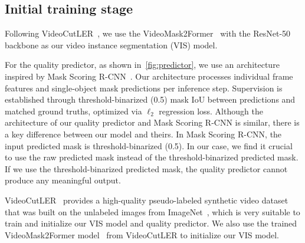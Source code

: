 \subsection{Initial training stage}
\label{sec:initial_model}

Following VideoCutLER~\cite{videocutler}, we use the VideoMask2Former~\cite{mask2former, videomask2former} with the ResNet-50~\cite{resnet} backbone as our video instance segmentation (VIS) model.

For the quality predictor, as shown in~\cref{fig:predictor}, we use an architecture
inspired by Mask Scoring R-CNN~\cite{maskscore}. Our architecture processes individual frame features and single-object mask predictions per inference step. Supervision is established through threshold-binarized (0.5) mask IoU between predictions and matched ground truths, optimized via $\ell_2$ regression loss.
Although the architecture of our quality predictor and Mask Scoring R-CNN is similar, there is a key difference between our model and theirs. In Mask Scoring R-CNN, the input predicted mask is threshold-binarized (0.5). In our case, we find it crucial to use the raw predicted mask instead of the threshold-binarized predicted mask. If we use the threshold-binarized predicted mask, the quality predictor cannot produce any meaningful output. 

VideoCutLER~\cite{videocutler} provides a high-quality pseudo-labeled synthetic video dataset that was built on the unlabeled images from ImageNet~\cite{imagenet}, which is very suitable to train and initialize our VIS model and quality predictor. We also use the trained VideoMask2Former model~\cite{videomask2former} from VideoCutLER to initialize our VIS model.

